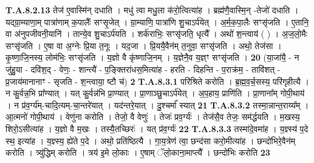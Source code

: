 \documentclass[17pt]{extarticle}
\begin{document}
                  \newline
                                                                  \textbf{ T.A.8.2.13} \newline
                  तेज॑ ए॒वास्मि॑न् दधाति । मधु॑ त्वा मधु॒ला क॑रो॒त्वित्या॑ह । ब्रह्म॑णै॒वास्मि॒न् -तेजो॑ दधाति ।  यद्ग्रा॒म्याणा॒म् पात्रा॑णाम् क॒पालैः᳚ सꣳसृ॒जेत् ।  ग्रा॒म्याणि॒ पात्रा॑णि शु॒चाऽर्प॑येत् । अ॒र्म॒क॒पा॒लैः सꣳसृ॑जति । ए॒तानि॒ वा अ॑नुपजीवनी॒यानि॑ । तान्ये॒व शु॒चाऽर्प॑यति ।  शर्क॑राभिः॒ सꣳसृ॑जति॒ धृत्यै᳚ । अथो॑ श॒न्त्वाय॑ ( ) । अ॒ज॒लो॒मैः सꣳसृ॑जति । ए॒षा वा अ॒ग्नेः प्रि॒या त॒नूः । यद॒जा । प्रि॒ययै॒वैन॑म् त॒नुवा॒ सꣳसृ॑जति । अथो॒ तेज॑सा । कृ॒ष्णा॒जि॒नस्य॒ लोम॑भिः॒ सꣳसृ॑जति । य॒ज्ञो वै कृ॑ष्णाजि॒नम् ।  य॒ज्ञेनै॒व य॒ज्ञ्ꣳ सꣳसृ॑जति । \textbf{ 20} \newline
                  \newline
                                                        (या॒जा॑यै॒ - न जु॑हु॒या - दवि॑श॒द् - वेणः॒ - शान्त्यै॑ - प॒ङ्क्तिरा॑धस॒मित्या॑ह - हरति - दिहन्ति - प॒राक्र॑म॒ - तावि॑शत् - प्र॒जाय॑मानानाꣳ - सृजति - श॒न्त्वाया॒ ष्टौ च॑) \textbf{2} \newline \newline
                                \textbf{ T.A.8.3.1} \newline
                  परि॑श्रिते करोति । ब्र॒ह्म॒व॒र्च॒सस्य॒ परि॑गृहीत्यै । न कु॒र्वन्न॒भि प्रा᳚ण्यात् । यत् कु॒र्वन्न॑भि प्रा॒ण्यात् । प्रा॒णाञ्छु॒चाऽर्प॑येत् । अ॒प॒हाय॒ प्राणि॑ति ।  प्रा॒णाना᳚म् गोपी॒थाय॑ । न प्र॑व॒र्ग्य॑म्-चादि॒त्यम्-चा॒न्तरे॑यात् । यद॑न्तरे॒यात् । दु॒श्चर्मा᳚ स्यात् \textbf{ 21} \newline
                  \newline
                                                                  \textbf{ T.A.8.3.2} \newline
                  तस्मा॒न्नान्त॒राय्य᳚म् । आ॒त्मनो॑ गोपी॒थाय॑ । वेणु॑ना करोति । तेजो॒ वै वेणुः॑ । तेजः॑ प्रव॒र्ग्यः॑ । तेज॑सै॒व तेजः॒ सम॑र्द्धयति । म॒खस्य॒ शिरो॒ऽसीत्या॑ह । य॒ज्ञो वै म॒खः । तस्यै॒तच्छिरः॑ । यत् प्र॑व॒र्ग्यः॑ \textbf{ 22} \newline
                  \newline
                                                                  \textbf{ T.A.8.3.3} \newline
                  तस्मा॑दे॒वमा॑ह । य॒ज्ञ्स्य॑ प॒दे स्थ॒ इत्या॑ह । य॒ज्ञ्स्य॒ ह्ये॑ते प॒दे । अथो॒ प्रति॑ष्ठित्यै । गा॒य॒त्रेण॑ त्वा॒ छन्द॑सा करो॒मीत्या॑ह ।  छन्दो॑भिरे॒वैन॑म् करोति । त्र्यु॑द्धिम् करोति । त्रय॑ इ॒मे लो॒काः । ए॒षाम् ॅलो॒काना॒माप्त्यै᳚ । छन्दो॑भिः करोति \textbf{ 23} \newline
\end{document}
